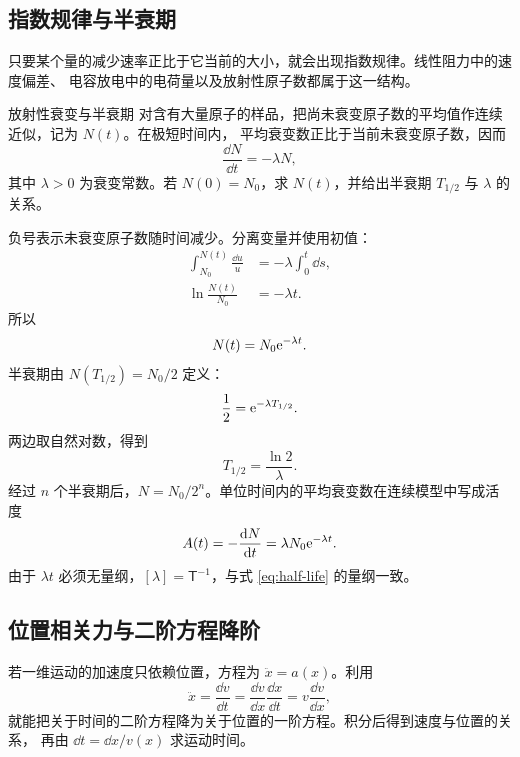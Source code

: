 \documentclass[UTF8,zihao=-4,oneside,openany]{ctexbook}
\begin{document}
\subsection{指数规律与半衰期}

只要某个量的减少速率正比于它当前的大小，就会出现指数规律。线性阻力中的速度偏差、
电容放电中的电荷量以及放射性原子数都属于这一结构。

\begin{examplebox}{放射性衰变与半衰期}
对含有大量原子的样品，把尚未衰变原子数的平均值作连续近似，记为 $N(t)$。在极短时间内，
平均衰变数正比于当前未衰变原子数，因而
\[
  \frac{\dd N}{\dd t}=-\lambda N,
\]
其中 $\lambda>0$ 为衰变常数。若 $N(0)=N_0$，求 $N(t)$，并给出半衰期
$T_{1/2}$ 与 $\lambda$ 的关系。

\tcblower
负号表示未衰变原子数随时间减少。分离变量并使用初值：
\begin{align*}
  \int_{N_0}^{N(t)}\frac{\dd u}{u}
  &=-\lambda\int_0^t\dd s,\\
  \ln\frac{N(t)}{N_0}&=-\lambda t.
\end{align*}
所以
\begin{equation}
  N(t)=N_0\mathrm e^{-\lambda t}.
  \label{eq:radioactive-decay}
\end{equation}
半衰期由 $N(T_{1/2})=N_0/2$ 定义：
\[
  \frac12=\mathrm e^{-\lambda T_{1/2}}.
\]
两边取自然对数，得到
\begin{equation}
  T_{1/2}=\frac{\ln2}{\lambda}.
  \label{eq:half-life}
\end{equation}
经过 $n$ 个半衰期后，$N=N_0/2^n$。单位时间内的平均衰变数在连续模型中写成活度
\begin{equation}
  A(t)=-\frac{\mathop{}\!\mathrm{d} N}{\mathop{}\!\mathrm{d} t}=\lambda N_0\mathrm e^{-\lambda t}.
  \label{eq:radioactive-activity}
\end{equation}
由于 $\lambda t$ 必须无量纲，$[\lambda]=\mathsf T^{-1}$，与式
\eqref{eq:half-life} 的量纲一致。
\end{examplebox}

\subsection{位置相关力与二阶方程降阶}

若一维运动的加速度只依赖位置，方程为 $\ddot x=a(x)$。利用
\begin{equation}
  \ddot x=\frac{\dd v}{\dd t}
  =\frac{\dd v}{\dd x}\frac{\dd x}{\dd t}
  =v\frac{\dd v}{\dd x},
  \label{eq:ode-order-reduction}
\end{equation}
就能把关于时间的二阶方程降为关于位置的一阶方程。积分后得到速度与位置的关系，
再由 $\dd t=\dd x/v(x)$ 求运动时间。
\end{document}
